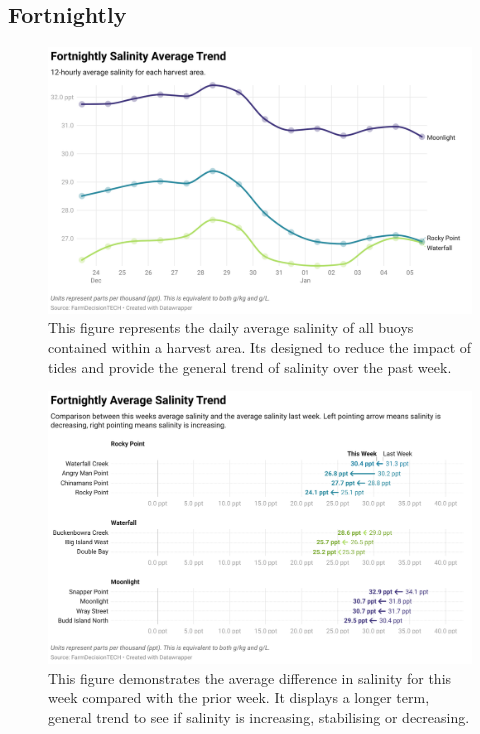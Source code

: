\documentclass[10pt]{article}
\begin{document}
\pagebreak

\subsection{Fortnightly}

\begin{figure}[H]
\centering
\includegraphics[width=\textwidth]{fortnightly-salinity-chart.png}
\caption[Average Fortnightly Salinity Chart]{This figure represents the daily average salinity of all buoys contained within a harvest area. Its designed to reduce the impact of tides and provide the general trend of salinity over the past week.}
\end{figure}

\begin{figure}[H]
\centering
\includegraphics[width=\textwidth]{fortnightly-salinity.png}
\caption[Average Fortnightly Salinity Difference]{This figure demonstrates the average difference in salinity for this week compared with the prior week. It displays a longer term, general trend to see if salinity is increasing, stabilising or decreasing.}
\end{figure}
\end{document}
